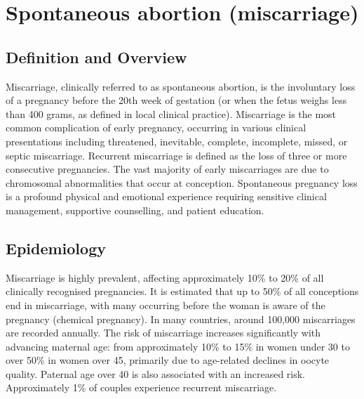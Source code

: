 \chapter{Spontaneous abortion (miscarriage)}

\section*{Definition and Overview}
Miscarriage, clinically referred to as spontaneous abortion, is the involuntary loss of a pregnancy before the 20th week of gestation (or when the fetus weighs less than 400 grams, as defined in local clinical practice). Miscarriage is the most common complication of early pregnancy, occurring in various clinical presentations including threatened, inevitable, complete, incomplete, missed, or septic miscarriage. Recurrent miscarriage is defined as the loss of three or more consecutive pregnancies. The vast majority of early miscarriages are due to chromosomal abnormalities that occur at conception. Spontaneous pregnancy loss is a profound physical and emotional experience requiring sensitive clinical management, supportive counselling, and patient education.

\section*{Epidemiology}
Miscarriage is highly prevalent, affecting approximately 10\% to 20\% of all clinically recognised pregnancies. It is estimated that up to 50\% of all conceptions end in miscarriage, with many occurring before the woman is aware of the pregnancy (chemical pregnancy). In many countries, around 100,000 miscarriages are recorded annually. The risk of miscarriage increases significantly with advancing maternal age: from approximately 10\% to 15\% in women under 30 to over 50\% in women over 45, primarily due to age-related declines in oocyte quality. Paternal age over 40 is also associated with an increased risk. Approximately 1\% of couples experience recurrent miscarriage.

